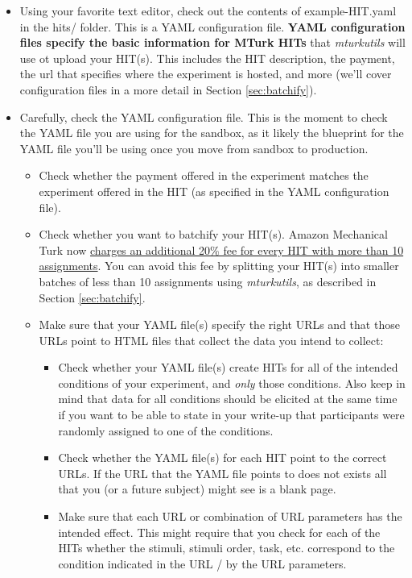 \documentclass{article}
\begin{document}
\begin{itemize}

   \item Using your favorite text editor, check out the contents of example-HIT.yaml in the hits/ folder. This is a YAML configuration file. {\bf YAML configuration files specify the basic information for MTurk HITs} that {\em mturkutils} will use ot upload your HIT(s). This includes the HIT description, the payment, the url that specifies where the experiment is hosted, and more (we'll cover configuration files in a more detail in Section \ref{sec:batchify}). 
   
   \item Carefully, check the YAML configuration file. This is the moment to check the YAML file you are using for the sandbox, as it likely the blueprint for the YAML file you'll be using once you move from sandbox to production.
   
\begin{tcolorbox}[colback=gray!5,colframe=blue!40!black,title=Sandbox checklist---{\em before} uploading HIT(s) to sandbox]
  \begin{itemize}
    \item Check whether the payment offered in the experiment matches the experiment offered in the HIT (as specified in the YAML configuration file).
    \item Check whether you want to batchify your HIT(s). Amazon Mechanical Turk now \href{https://requester.mturk.com/pricing}{charges an additional 20\% fee for every HIT with more than 10 assignments}. You can avoid this fee by splitting your HIT(s) into smaller batches of less than 10 assignments using {\em mturkutils}, as described in Section \ref{sec:batchify}.
    \item Make sure that your YAML file(s) specify the right URLs and that those URLs point to HTML files that collect the data you intend to collect:
    \begin{itemize}
      \item Check whether your YAML file(s) create HITs for all of the intended conditions of your experiment, and {\em only} those conditions. Also keep in mind that data for all conditions should be elicited at the same time if you want to be able to state in your write-up that participants were randomly assigned to one of the conditions.
     \item Check whether the YAML file(s) for each HIT point to the correct URLs. If the URL that the YAML file points to does not exists all that you (or a future subject) might see is a blank page.
      \item Make sure that each URL or combination of URL parameters has the intended effect. This might require that you check for each of the HITs whether the stimuli, stimuli order, task, etc. correspond to the condition indicated in the URL / by the URL parameters.
    \end{itemize}
  \end{itemize}
\end{tcolorbox}


\end{itemize}
\end{document}
